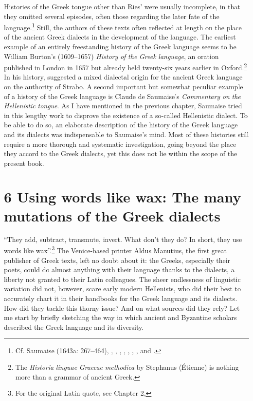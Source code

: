 Histories of the Greek tongue other than Ries’ were usually incomplete, in that they omitted several episodes, often those regarding the later fate of the language.\footnote{Cf. Saumaise (1643a: 267–464), \citet{Burton1657}, \citet{LagerlööfPalmroot1685}, \citet{Rodigast1685}, \citet{Eling1691}, \citet{Florinus1707}, \citet{Reinhard1724}, \citet{MuntheHeiberg1748}, and \citet{Harles1778}.} Still, the authors of these texts often reflected at length on the place of the ancient Greek dialects in the development of the language. The earliest example of an entirely freestanding history of the Greek language seems to be William Burton’s (1609–1657) \textit{History} \textit{of} \textit{the} \textit{Greek} \textit{language}, an oration published in London in 1657 but already held twenty-six years earlier in Oxford.\footnote{The \textit{Historia} \textit{linguae} \textit{Graecae} \textit{methodica} by Stephanus (Étienne) \citet{Simon1615} is nothing more than a grammar of ancient Greek.} In his history, \citet[27]{Burton1657} suggested a mixed dialectal origin for the ancient Greek language on the authority of Strabo. A second important but somewhat peculiar example of a history of the Greek language is Claude de Saumaise’s \textit{Commentary} \textit{on} \textit{the} \textit{Hellenistic} \textit{tongue}. As I have mentioned in the previous chapter, Saumaise tried in this lengthy work to disprove the existence of a so-called Hellenistic dialect. To be able to do so, an elaborate description of the history of the Greek language and its dialects was indispensable to Saumaise’s mind. Most of these histories still require a more thorough and systematic investigation, going beyond the place they accord to the Greek dialects, yet this does not lie within the scope of the present book.

\section{6 Using words like wax: The many mutations of the Greek dialects}
\hypertarget{Toc19704843}{}\begin{styleCatalogusnotities}
“They add, subtract, transmute, invert. What don’t they do? In short, they use words like wax”.\footnote{ \textrm{For the original Latin quote, see Chapter 2, }} The Venice-based printer Aldus Manutius, the first great publisher of Greek texts, left no doubt about it: the Greeks, especially their poets, could do almost anything with their language thanks to the dialects, a liberty not granted to their Latin colleagues. The sheer endlessness of linguistic variation did not, however, scare early modern Hellenists, who did their best to accurately chart it in their handbooks for the Greek language and its dialects. How did they tackle this thorny issue? And on what sources did they rely? Let me start by briefly sketching the way in which ancient and Byzantine scholars described the Greek language and its diversity.
\end{styleCatalogusnotities}

